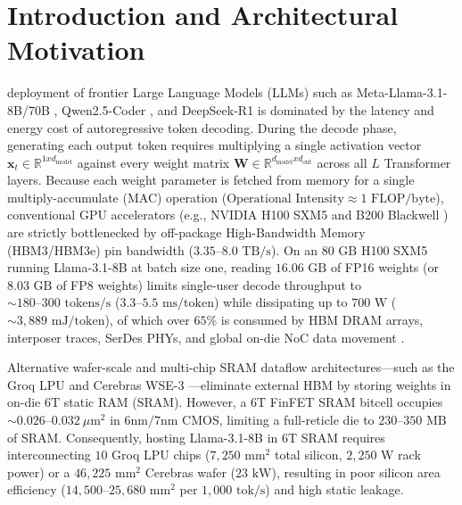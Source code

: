 \documentclass[10pt,journal,compsoc]{IEEEtran}
\def\texttt#1{#1}%
\def\times{x}%
\begin{document}
\maketitle
\IEEEdisplaynontitleabstractindextext
\IEEEpeerreviewmaketitle

\section{Introduction and Architectural Motivation}
 deployment of frontier Large Language Models (LLMs) such as \texttt{Meta-Llama-3.1-8B/70B} \cite{dubey2024llama3}, \texttt{Qwen2.5-Coder} \cite{hui2024qwen25}, and \texttt{DeepSeek-R1} \cite{deepseek2025r1} is dominated by the latency and energy cost of autoregressive token decoding. During the decode phase, generating each output token requires multiplying a single activation vector $\mathbf{x}_t \in \mathbb{R}^{1 \times d_{\text{model}}}$ against every weight matrix $\mathbf{W} \in \mathbb{R}^{d_{\text{model}} \times d_{\text{out}}}$ across all $L$ Transformer layers. Because each weight parameter is fetched from memory for a single multiply-accumulate (MAC) operation ($\text{Operational Intensity} \approx 1\text{ FLOP/byte}$), conventional GPU accelerators (e.g., NVIDIA H100 SXM5 \cite{nvidia2022h100} and B200 Blackwell \cite{nvidia2024b200}) are strictly bottlenecked by off-package High-Bandwidth Memory (HBM3/HBM3e) pin bandwidth ($3.35\text{--}8.0\text{ TB/s}$). On an $80\text{ GB}$ H100 SXM5 running \texttt{Llama-3.1-8B} at batch size one, reading $16.06\text{ GB}$ of \texttt{FP16} weights (or $8.03\text{ GB}$ of \texttt{FP8} weights) limits single-user decode throughput to $\sim 180\text{--}300\text{ tokens/s}$ ($3.3\text{--}5.5\text{ ms/token}$) while dissipating up to $700\text{ W}$ ($\sim 3,889\text{ mJ/token}$), of which over $65\%$ is consumed by HBM DRAM arrays, interposer traces, SerDes PHYs, and global on-die NoC data movement \cite{horowitz2014energy}.

Alternative wafer-scale and multi-chip SRAM dataflow architectures---such as the Groq LPU \cite{abts2022groq} and Cerebras WSE-3 \cite{lie2023cerebras}---eliminate external HBM by storing weights in on-die $6\text{T}$ static RAM (SRAM). However, a $6\text{T}$ FinFET SRAM bitcell occupies $\sim 0.026\text{--}0.032\ \mu\text{m}^2$ in $6\text{nm}/7\text{nm}$ CMOS, limiting a full-reticle die to $230\text{--}350\text{ MB}$ of SRAM. Consequently, hosting \texttt{Llama-3.1-8B} in $6\text{T}$ SRAM requires interconnecting $10$ Groq LPU chips ($7,250\text{ mm}^2$ total silicon, $2,250\text{ W}$ rack power) or a $46,225\text{ mm}^2$ Cerebras wafer ($23\text{ kW}$), resulting in poor silicon area efficiency ($14,500\text{--}25,680\text{ mm}^2$ per $1,000\text{ tok/s}$) and high static leakage.
\end{document}
